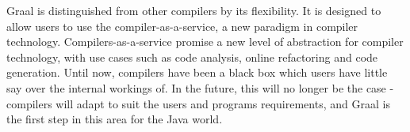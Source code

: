 Graal is distinguished from other compilers by its flexibility. It is designed to allow users to use the compiler-as-a-service, a new paradigm in compiler technology. Compilers-as-a-service promise a new level of abstraction for compiler technology, with use cases such as code analysis, online refactoring and code generation. Until now, compilers have been a black box which users have little say over the internal workings of. In the future, this will no longer be the case - compilers will adapt to suit the users and programs requirements, and Graal is the first step in this area for the Java world.